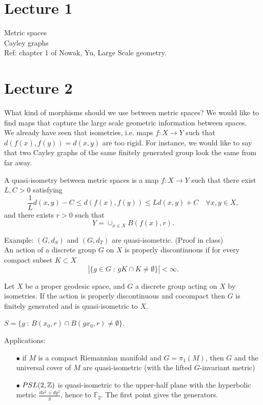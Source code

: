 \section{Lecture 1}

Metric spaces\\
Cayley graphs\\

Ref: chapter 1 of Nowak, Yu, Large Scale geometry.
\section{Lecture 2}

What kind of morphisms should we use between metric spaces? We would like to find maps that capture the large scale geometric information between spaces.\\

We already have seen that isometries, i.e. maps $f : X\rightarrow Y$ such that $d(f(x),f(y)) = d(x,y)$ are too rigid. For instance, we would like to say that two Cayley graphs of the same finitely generated group look the same from far away. 

\begin{definition}
A quasi-isometry between metric spaces is a map $f : X\rightarrow Y$ such that there exist $L,C>0$ satisfying
\[\frac{1}{L} d(x,y) - C \leq d(f(x),f(y)) \leq L d(x,y) + C \quad \forall x,y \in X,\]
and there exists $r>0$ such that 
\[Y = \cup_{x\in X} B(f(x), r).\]
\end{definition}

Example: $(G,d_S)$ and $(G,d_T)$ are quasi-isometric. (Proof in class)\\

An action of a discrete group $G$ on $X$ is properly discontinuous if for every compact subset $K\subset X$
\[ | \{ g\in G  \ : \ gK \cap K \neq \emptyset \} | <\infty.\]

\begin{thm}
Let $X$ be a proper geodesic space, and $G$ a discrete group acting on $X$ by isometries. If the action is properly discontinuous and cocompact then $G$ is finitely generated and is quasi-isometric to $X$.
\end{thm} 

$S = \{ g \ : \ B(x_0, r)\cap B(gx_0,r)\neq \emptyset \}$.

Applications: 
\begin{itemize}
\item[$\bullet$] if $M$ is a compact Riemannian manifold and $G=\pi_1(M)$, then $G$ and the universal cover of $M$ are quasi-isometric (with the lifted $G$-invariant metric)
\item[$\bullet$] $PSL(2, \mathbb Z)$ is quasi-isometric to the upper-half plane with the hyperbolic metric $\frac{dx^2+dy^2}{y}$, hence to $\mathbb F_2$. The first point gives the generators.\\
\end{itemize}

